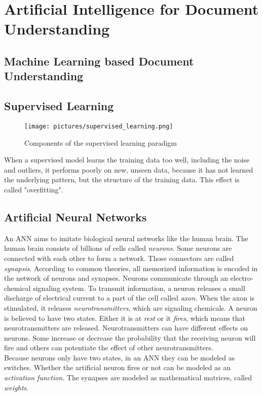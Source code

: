 \section{Artificial Intelligence for Document Understanding}
\subsection{Machine Learning based Document Understanding}

\subsection{Supervised Learning}

\begin{figure}[ht]
    \centering 
    \texttt{[image: pictures/supervised\_learning.png]}
    \caption{Components of the supervised learning paradigm \cite{knudsen1994supervised}}
    \label{pic:supervised}    %
\end{figure}

When a supervised model learns the training data too well, including the noise and outliers, it performs poorly on new, unseen data, because it has not learned the underlying pattern, but the structure of the training data. This effect is called "overfitting".
\cite{haykin2009neural,knudsen1994supervised}

\subsection{Artificial Neural Networks}
An \acf{ANN} aims to imitate biological neural networks like the human brain. The human brain consists of billions of cells called \textit{neurons}. Some neurons are connected with each other to form a network. Those connectors are called \textit{synapsis}. According to common theories, all memorized information is encoded in the network of neurons and synapses. Neurons communicate through an electro-chemical signaling system. To transmit information, a neuron releases a small discharge of electrical current to a part of the cell called \textit{axon}. When the axon is stimulated, it releases \textit{neurotransmitters}, which are signaling chemicals. 
A neuron is believed to have two states. Either it is at \textit{rest} or it \textit{fires}, which means that neurotransmitters are released. 
Neurotransmitters can have different effects on neurons. Some increase or decrease the probability that the receiving neuron will fire and others can potentiate the effect of other neurotransmitters. \\
Because neurons only have two states, in an \ac{ANN} they can be modeled as switches. Whether the artificial neuron fires or not can be modeled as an \textit{activation function}. The synapses are modeled as mathematical matrices, called \textit{weights}.
\cite{haykin2009neural,knudsen1994supervised}

